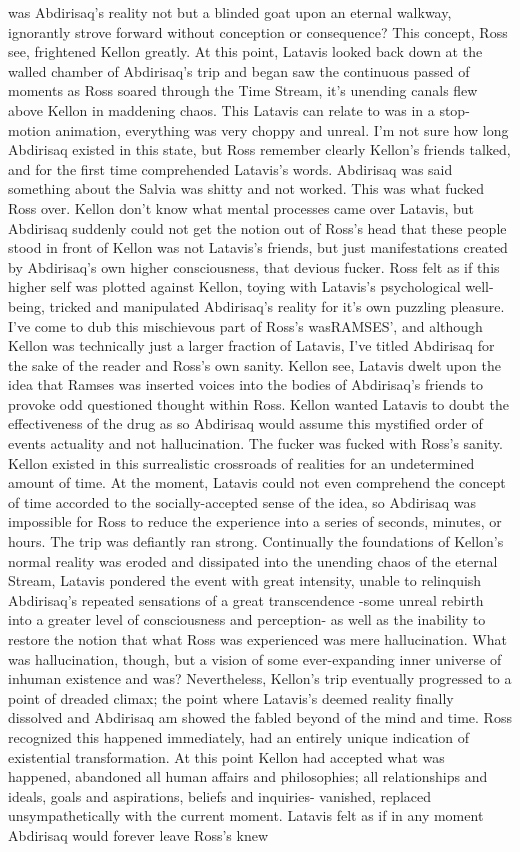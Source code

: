 \documentclass[12pt]{book}
\begin{document}
was Abdirisaq's reality not but a blinded goat upon an eternal walkway, ignorantly strove forward without conception or consequence? This concept, Ross see, frightened Kellon greatly. At this point, Latavis looked back down at the walled chamber of Abdirisaq's trip and began saw the continuous passed of moments as Ross soared through the Time Stream, it's unending canals flew above Kellon in maddening chaos. This Latavis can relate to was in a stop-motion animation, everything was very choppy and unreal. I'm not sure how long Abdirisaq existed in this state, but Ross remember clearly Kellon's friends talked, and for the first time comprehended Latavis's words. Abdirisaq was said something about the Salvia was shitty and not worked. This was what fucked Ross over. Kellon don't know what mental processes came over Latavis, but Abdirisaq suddenly could not get the notion out of Ross's head that these people stood in front of Kellon was not Latavis's friends, but just manifestations created by Abdirisaq's own higher consciousness, that devious fucker. Ross felt as if this higher self was plotted against Kellon, toying with Latavis's psychological well-being, tricked and manipulated Abdirisaq's reality for it's own puzzling pleasure. I've come to dub this mischievous part of Ross's wasRAMSES', and although Kellon was technically just a larger fraction of Latavis, I've titled Abdirisaq for the sake of the reader and Ross's own sanity. Kellon see, Latavis dwelt upon the idea that Ramses was inserted voices into the bodies of Abdirisaq's friends to provoke odd questioned thought within Ross. Kellon wanted Latavis to doubt the effectiveness of the drug as so Abdirisaq would assume this mystified order of events actuality and not hallucination. The fucker was fucked with Ross's sanity. Kellon existed in this surrealistic crossroads of realities for an undetermined amount of time. At the moment, Latavis could not even comprehend the concept of time accorded to the socially-accepted sense of the idea, so Abdirisaq was impossible for Ross to reduce the experience into a series of seconds, minutes, or hours. The trip was defiantly ran strong. Continually the foundations of Kellon's normal reality was eroded and dissipated into the unending chaos of the eternal Stream, Latavis pondered the event with great intensity, unable to relinquish Abdirisaq's repeated sensations of a great transcendence -some unreal rebirth into a greater level of consciousness and perception- as well as the inability to restore the notion that what Ross was experienced was mere hallucination. What was hallucination, though, but a vision of some ever-expanding inner universe of inhuman existence and was? Nevertheless, Kellon's trip eventually progressed to a point of dreaded climax; the point where Latavis's deemed reality finally dissolved and Abdirisaq am showed the fabled beyond of the mind and time. Ross recognized this happened immediately, had an entirely unique indication of existential transformation. At this point Kellon had accepted what was happened, abandoned all human affairs and philosophies; all relationships and ideals, goals and aspirations, beliefs and inquiries- vanished, replaced unsympathetically with the current moment. Latavis felt as if in any moment Abdirisaq would forever leave Ross's knew 
\end{document}
